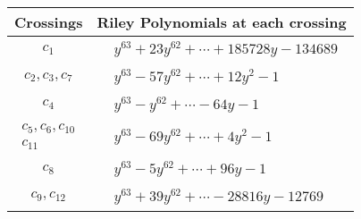 \documentclass[1p]{elsarticle_modified}
\theoremstyle{definition}
\begin{document}
\begin{tabular}{m{50pt}|m{274pt}}
Crossings & \hspace{64pt}Riley Polynomials at each crossing \\
\hline $$\begin{aligned}c_{1}\end{aligned}$$&$\begin{aligned}
&y^{63}+23 y^{62}+\cdots+185728 y-134689
\end{aligned}$\\
\hline $$\begin{aligned}c_{2},c_{3},c_{7}\end{aligned}$$&$\begin{aligned}
&y^{63}-57 y^{62}+\cdots+12 y^2-1
\end{aligned}$\\
\hline $$\begin{aligned}c_{4}\end{aligned}$$&$\begin{aligned}
&y^{63}- y^{62}+\cdots-64 y-1
\end{aligned}$\\
\hline $$\begin{aligned}c_{5},c_{6},c_{10}\\c_{11}\end{aligned}$$&$\begin{aligned}
&y^{63}-69 y^{62}+\cdots+4 y^2-1
\end{aligned}$\\
\hline $$\begin{aligned}c_{8}\end{aligned}$$&$\begin{aligned}
&y^{63}-5 y^{62}+\cdots+96 y-1
\end{aligned}$\\
\hline $$\begin{aligned}c_{9},c_{12}\end{aligned}$$&$\begin{aligned}
&y^{63}+39 y^{62}+\cdots-28816 y-12769
\end{aligned}$\\
\hline
\end{tabular}
\vskip 2pc
\end{document}
